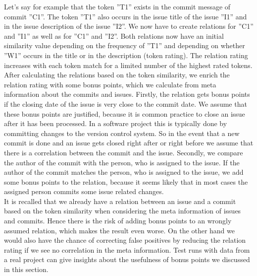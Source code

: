 Let's say for example that the token ''T1'' exists in the commit message of commit ''C1''.
The token ''T1'' also occurs in the issue title of the issue ''I1'' and in the issue description of the issue ''I2''.
We now have to create relations for ''C1'' and ''I1'' as well as for ''C1'' and ''I2''.
Both relations now have an initial similarity value depending on the frequency of ''T1'' and depending on whether ''W1'' occurs in the title or in the description (token rating).
The relation rating increases with each token match for a limited number of the highest rated tokens.\\

After calculating the relations based on the token similarity, we enrich the relation rating with some bonus points, which we calculate from meta information about the commits and issues.
Firstly, the relation gets bonus points if the closing date of the issue is very close to the commit date.
We assume that these bonus points are justified, because it is common practice to close an issue after it has been processed.
In a software project this is typically done by committing changes to the version control system.
So in the event that a new commit is done and an issue gets closed right after or right before we assume that there is a correlation between the commit and the issue.
Secondly, we compare the author of the commit with the person, who is assigned to the issue.
If the author of the commit matches the person, who is assigned to the issue, we add some bonus points to the relation, because it seems likely that in most cases the assigned person commits some issue related changes.\\

It is recalled that we already have a relation between an issue and a commit based on the token similarity when considering the meta information of issues and commits.
Hence there is the risk of adding bonus points to an wrongly assumed relation, which makes the result even worse.
On the other hand we would also have the chance of correcting false positives by reducing the relation rating if we see no correlation in the meta information.
Test runs with data from a real project can give insights about the usefulness of bonus points we discussed in this section.
